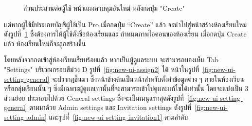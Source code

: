 \documentclass[12pt,one side,openright,a4paper]{cpe-thesis-th}
\newcommand{\thaijustify}[1]{%
  \par\hspace{30pt}\justifying
  #1
}
\begin{document}
\begin{figure}[H]
  \centering
  \caption[ส่วนประสานต่อผู้ใช้ หน้าเเผงควบคุมอันใหม่ (กดปุ่ม "Create")]{ส่วนประสานต่อผู้ใช้ หน้าเเผงควบคุมอันใหม่ หลังกดปุ่ม "Create"}
  \label{fig:new-ui-dashboard3}
\end{figure}
\thaijustify{
  แต่หากผู้ใช้มีประเภทบัญชีผู้ใช้เป็น Pro เมื่อกดปุ่ม “Create” แล้ว จะนำไปสู่หน้าสร้างห้องเรียนใหม่ ดังรูปที่~\ref{fig:new-ui-dashboard3} ซึ่งต้องการให้ผู้ใช้ตั้งชื่อห้องเรียนและ   กำหนดภาพไอคอนของห้องเรียน เมื่อกดปุ่ม Create แล้ว ห้องเรียนใหม่ก็จะถูกสร้างขึ้น
}
\pagebreak
\thaijustify{
  โดยหลังจากกดเข้าสู่ห้องเรียนเรียบร้อยแล้ว หากเป็นผู้ดูแลระบบ จะสามารถมองเห็น Tab "Settings" บริเวณกรอบสีม่วง D รูปที่~\ref{fig:new-ui-assign2} ได้ หน้าในรูปที่~\ref{fig:new-ui-setting-general} จะปรากฎขึ้นมา ซึ่งหน้าข้างต้นเป็นหน้าสำหรับตั้งค่าข้อมูลต่าง ๆ ภายในห้องเรียนหรือกลุ่มเรียนนั้น ๆ ซึ่งมีเฉพาะผู้ดูเเลเท่านั้นที่จะสามารถเข้าไปดูเเละเเก้ไขได้เท่านั้น โดยจะแบ่งเป็น 3 ส่วนย่อย ประกอบไปด้วย General settings ซึ่งจะเป็นเมนูแรกสุดดังรูปที่~\ref{fig:new-ui-setting-general} ตามมาด้วย Admin settings และ Invitation settings ดังรูปที่~\ref{fig:new-ui-setting-admin} และรูปที่~\ref{fig:new-ui-setting-invitation1} ตามลำดับ
}
\end{document}
